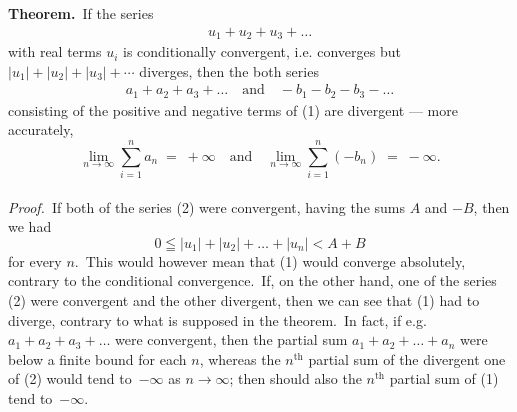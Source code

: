 \documentclass[12pt]{article}
\theoremstyle{definition}
\begin{document}
 

\textbf{Theorem.}\, If the series
\begin{align}
u_1\!+\!u_2\!+\!u_3\!+\ldots
\end{align}
with real terms $u_i$ is conditionally convergent, i.e. converges but $|u_1|\!+\!|u_2|\!+\!|u_3|\!+\cdots$ diverges,
then the both series
\begin{align}
a_1\!+\!a_2\!+\!a_3\!+\ldots \quad \mbox{and} \quad -b_1\!-\!b_2\!-\!b_3\!-\ldots
\end{align}
consisting of the positive and negative terms of (1) are divergent --- more accurately,
$$\lim_{n\to\infty}\sum_{i=1}^na_n \;=\; +\infty\quad\mbox{and}\quad\lim_{n\to\infty}\sum_{i=1}^n(-b_n) \;=\; -\infty.$$\\

{\em Proof.}\, If both of the series (2) were convergent, having the sums $A$ and $-B$, then we had 
$$0 \leqq |u_1|\!+\!|u_2|\!+\ldots+\!|u_n| < A\!+\!B$$
for every $n$.\, This would however mean that (1) would converge absolutely, contrary to the conditional convergence.\, If, on the other hand, one of the series (2) were convergent and the other divergent, then we can see that (1) had to diverge, contrary to what is supposed in the theorem.\, In fact, if e.g. $a_1\!+\!a_2\!+\!a_3\!+\ldots$ were convergent, then the partial sum $a_1\!+\!a_2\!+\ldots+\!a_n$ were below a finite bound for each $n$, whereas the 
$n^\mathrm{th}$ partial sum of the divergent one of (2) would tend to\, $-\infty$ as $n \to \infty$; then should also the $n^\mathrm{th}$ partial sum of (1) tend to\, $-\infty$.
\end{document}
